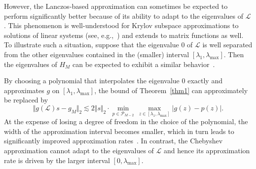 \documentclass{article}
\newcommand{\Lap}{\mathcal{L}}
\begin{document}
However, the Lanczos-based approximation can sometimes be expected to perform significantly better because of its ability to adapt to the
eigenvalues of $\Lap$. This phenomenon is well-understood for Krylov subspace approximations to solutions of linear systems (see, e.g.,~\cite[Section 3.1]{Greenbaum1997})
and extends to matrix functions as well. To illustrate such a situation, suppose that the eigenvalue $0$ of $\Lap$ is well separated from the other eigenvalues
contained in the (smaller) interval $[\lambda_1,\lambda_{\max}]$.
Then the eigenvalues of $H_M$ can be expected to exhibit a similar behavior~\cite[Chapter 6]{Saad2011}.

By choosing a polynomial that interpolates the eigenvalue $0$ exactly and approximates $g$ on $[\lambda_1,\lambda_{\max}]$, the bound of Theorem~\ref{thm1} can approximately be replaced by
\[
 \Vert g(\Lap)s - g_M\Vert_2 \lesssim 2\Vert s \Vert_2 \cdot  \underset{p\in \mathcal{P}_{M-2}}{\operatorname{min}}\, \underset{z \in \left[\lambda_1, \lambda_{\max} \right]}{\operatorname{max}} \vert g(z) - p(z)\vert\text{.}
\]
At the expense of losing a degree of freedom in the choice of the polynomial, the width of the approximation interval becomes smaller,
which in turn leads to significantly improved approximation rates~\cite{phillips2003interpolation}. In contrast, the Chebyshev approximation cannot
adapt to the eigenvalues of $\Lap$ and hence its approximation rate is driven by the larger interval $[0,\lambda_{\max}]$.



% 
% 

\end{document}
